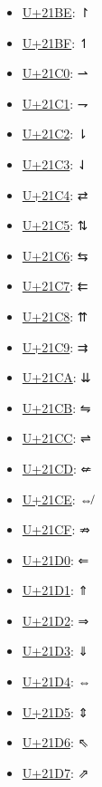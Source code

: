 \begin{itemize}
	\item \href{https://decodeunicode.org/en/u+21BE}{U+21BE}: ↾
	\item \href{https://decodeunicode.org/en/u+21BF}{U+21BF}: ↿
	\item \href{https://decodeunicode.org/en/u+21C0}{U+21C0}: ⇀
	\item \href{https://decodeunicode.org/en/u+21C1}{U+21C1}: ⇁
	\item \href{https://decodeunicode.org/en/u+21C2}{U+21C2}: ⇂
	\item \href{https://decodeunicode.org/en/u+21C3}{U+21C3}: ⇃
	\item \href{https://decodeunicode.org/en/u+21C4}{U+21C4}: ⇄
	\item \href{https://decodeunicode.org/en/u+21C5}{U+21C5}: ⇅
	\item \href{https://decodeunicode.org/en/u+21C6}{U+21C6}: ⇆
	\item \href{https://decodeunicode.org/en/u+21C7}{U+21C7}: ⇇
	\item \href{https://decodeunicode.org/en/u+21C8}{U+21C8}: ⇈
	\item \href{https://decodeunicode.org/en/u+21C9}{U+21C9}: ⇉
	\item \href{https://decodeunicode.org/en/u+21CA}{U+21CA}: ⇊
	\item \href{https://decodeunicode.org/en/u+21CB}{U+21CB}: ⇋
	\item \href{https://decodeunicode.org/en/u+21CC}{U+21CC}: ⇌
	\item \href{https://decodeunicode.org/en/u+21CD}{U+21CD}: ⇍
	\item \href{https://decodeunicode.org/en/u+21CE}{U+21CE}: ⇎
	\item \href{https://decodeunicode.org/en/u+21CF}{U+21CF}: ⇏
	\item \href{https://decodeunicode.org/en/u+21D0}{U+21D0}: ⇐
	\item \href{https://decodeunicode.org/en/u+21D1}{U+21D1}: ⇑
	\item \href{https://decodeunicode.org/en/u+21D2}{U+21D2}: ⇒
	\item \href{https://decodeunicode.org/en/u+21D3}{U+21D3}: ⇓
	\item \href{https://decodeunicode.org/en/u+21D4}{U+21D4}: ⇔
	\item \href{https://decodeunicode.org/en/u+21D5}{U+21D5}: ⇕
	\item \href{https://decodeunicode.org/en/u+21D6}{U+21D6}: ⇖
	\item \href{https://decodeunicode.org/en/u+21D7}{U+21D7}: ⇗

\end{itemize}
